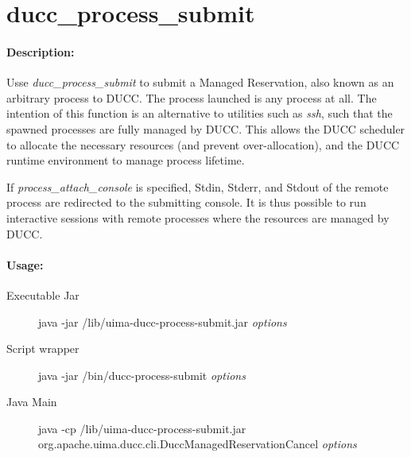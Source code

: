 \ifpdf
\else
{}
\fi
    \section{ducc\_process\_submit}

    \paragraph{Description:}
       Usse {\em ducc\_process\_submit} to submit a Managed Reservation, also known as an
       arbitrary process to DUCC.  The process launched is any process at all.  The intention
       of this function is an alternative to utilities such as {\em ssh}, such that the
       spawned processes are fully managed by DUCC.  This allows the DUCC scheduler to allocate
       the necessary resources (and prevent over-allocation), and the DUCC runtime environment
       to manage process lifetime.

       If {\em process\_attach\_console} is specified, Stdin, Stderr, and Stdout of the remote
       process are redirected to the submitting console.  It is thus possible to run interactive
       sessions with remote processes where the resources are managed by DUCC.

    \paragraph{Usage:}
    \begin{description}
    \item[Executable Jar] java -jar \ducchome/lib/uima-ducc-process-submit.jar {\em options}
    \item[Script wrapper] java -jar \ducchome/bin/ducc-process-submit {\em options}
    \item[Java Main]      java -cp \ducchome/lib/uima-ducc-process-submit.jar org.apache.uima.ducc.cli.DuccManagedReservationCancel {\em options}
    \end{description}

